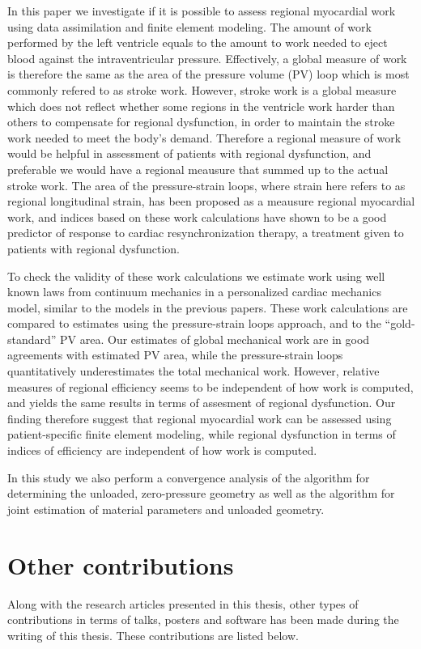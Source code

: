 In this paper we investigate if it is possible to assess regional
myocardial work using data assimilation and finite element modeling.
The amount of work performed by the left ventricle equals to the
amount to work needed to eject blood against the intraventricular
pressure. Effectively, a global measure of work is therefore the same
as the area of the pressure volume (PV) loop which is most commonly refered
to as stroke work.  However, stroke work is a global measure which
does not reflect whether some regions in the ventricle work harder than
others to compensate for regional dysfunction, in order to maintain the
stroke work needed to meet the body's demand. Therefore a regional
measure of work would be helpful in assessment of patients with
regional dysfunction, and preferable we would have a regional meausure
that summed up to the actual stroke work. The area of the
pressure-strain loops, where strain here refers to as regional
longitudinal strain, has been proposed as a meausure regional
myocardial work, and indices based on these work calculations have
shown to be a good predictor of response to cardiac resynchronization
therapy, a treatment given to patients with regional dysfunction.

To check the validity of these work calculations we estimate work
using well known laws from continuum mechanics in a personalized
cardiac mechanics model, similar to the models in the previous papers.
These work calculations are compared to estimates using the
pressure-strain loops approach, and to the ``gold-standard'' PV area.
Our estimates of global mechanical work are in good agreements with
estimated PV area, while the pressure-strain loops quantitatively
underestimates the total mechanical work. However, relative measures
of regional efficiency seems to be independent of how work is
computed, and yields the same results in terms of assesment of regional
dysfunction. Our finding therefore suggest that regional myocardial
work can be assessed using patient-specific finite element modeling,
while regional dysfunction in terms of indices of efficiency are
independent of how work is computed.

In this study we also perform a convergence analysis of the algorithm for
determining the unloaded, zero-pressure geometry as well as the
algorithm for joint estimation of material parameters and unloaded
geometry. 

\newpage
\section{Other contributions}
Along with the research articles presented in this thesis, other
types of contributions in terms of talks, posters and software has
been made during the writing of this thesis. These contributions are
listed below.

